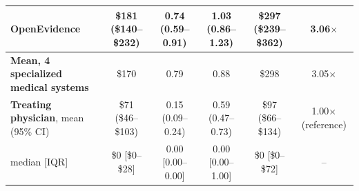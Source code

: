\begin{table}[h!]
\begin{tabular}{l c c c c c}
OpenEvidence & \$181 (\$140--\$232) & 0.74 (0.59--0.91) & 1.03 (0.86--1.23) & \$297 (\$239--\$362) & 3.06$\times$ \\
\midrule
\textbf{Mean, 4 specialized medical systems} & \$170 & 0.79 & 0.88 & \$298 & 3.05$\times$ \\
\midrule
\rowcolor{gray!8} \textbf{Treating physician}, mean (95\% CI) & \$71 (\$46--\$103) & 0.15 (0.09--0.24) & 0.59 (0.47--0.73) & \$97 (\$66--\$134) & 1.00$\times$ (reference) \\
\rowcolor{gray!8} \quad median [IQR] & \$0 [\$0--\$28] & 0.00 [0.00--0.00] & 0.00 [0.00--1.00] & \$0 [\$0--\$72] & -- \\
\bottomrule
\end{tabular}
\end{table}
